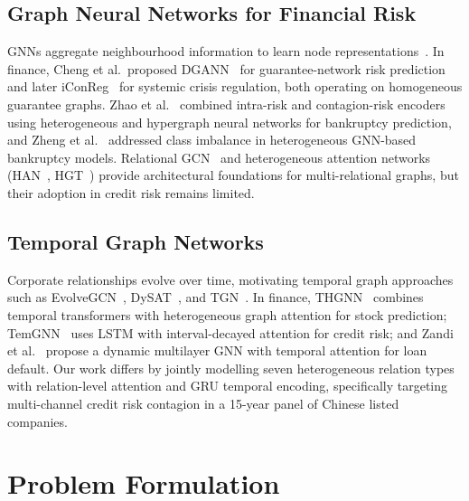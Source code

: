 \documentclass[3p,times,procedia]{elsarticle}
\begin{document}
\subsection{Graph Neural Networks for Financial Risk}
\label{subsec:gnn_finance}

GNNs aggregate neighbourhood information to learn node representations~\cite{kipf2017semi, velickovic2018graph, hamilton2017inductive}.
In finance, Cheng et al.\ proposed DGANN~\cite{cheng2020contagion} for guarantee-network risk prediction and later iConReg~\cite{cheng2022contagion} for systemic crisis regulation, both operating on homogeneous guarantee graphs.
Zhao et al.~\cite{zhao2024combining} combined intra-risk and contagion-risk encoders using heterogeneous and hypergraph neural networks for bankruptcy prediction, and Zheng et al.~\cite{zheng2023qtiah} addressed class imbalance in heterogeneous GNN-based bankruptcy models.
Relational GCN~\cite{schlichtkrull2018modeling} and heterogeneous attention networks (HAN~\cite{wang2019heterogeneous}, HGT~\cite{hu2020heterogeneous}) provide architectural foundations for multi-relational graphs, but their adoption in credit risk remains limited.

\subsection{Temporal Graph Networks}
\label{subsec:temporal_gnn}

Corporate relationships evolve over time, motivating temporal graph approaches such as EvolveGCN~\cite{pareja2020evolvegcn}, DySAT~\cite{sankar2020dysat}, and TGN~\cite{rossi2020temporal}.
In finance, THGNN~\cite{xiang2022temporal} combines temporal transformers with heterogeneous graph attention for stock prediction; TemGNN~\cite{wang2021temporal} uses LSTM with interval-decayed attention for credit risk; and Zandi et al.~\cite{zandi2024attention} propose a dynamic multilayer GNN with temporal attention for loan default.
Our work differs by jointly modelling seven heterogeneous relation types with relation-level attention and GRU temporal encoding, specifically targeting multi-channel credit risk contagion in a 15-year panel of Chinese listed companies.


\section{Problem Formulation}
\label{sec:problem}
\end{document}
